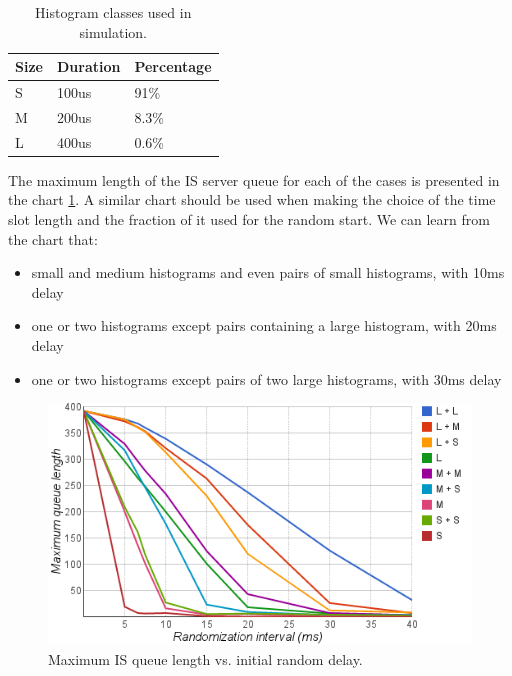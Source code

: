 \begin{table}
\centering
\begin{tabular}[ht]{ | l | l | l | }
  \hline                        
  Size & Duration & Percentage \\
  \hline                        
  S & 100us & 91\% \\
  \hline  
  M & 200us & 8.3\% \\
  \hline  
  L & 400us & 0.6\% \\
  \hline  
\end{tabular}
\caption{Histogram classes used in simulation.}
\label{tab:histosize}
\end{table}


The maximum length of the IS server queue for each of the cases is presented in the chart \ref{fig:one_slot_sim_qlen}. A similar chart should be used when making the choice of the time slot length and the fraction of it used for the random start. We can learn from the chart that:

\begin{itemize}
\item small and medium histograms and even pairs of small histograms, with 10ms delay
\item one or two histograms except pairs containing a large histogram, with 20ms delay
\item one or two histograms except pairs of two large histograms, with 30ms delay
\end{itemize}

\begin{figure}[ht]
\centering
\includegraphics[scale=0.6]{Images/one_slot_sim_qlen.png}
\caption{Maximum IS queue length vs. initial random delay.}
\label{fig:one_slot_sim_qlen}
\end{figure}


